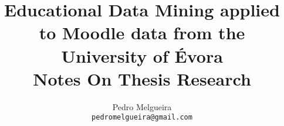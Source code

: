 \documentclass[12pt]{report}
\title{Educational Data Mining applied to Moodle data from the University of
Évora
\\
\large Notes On Thesis Research}
\author{Pedro Melgueira\\
    \small{\texttt{pedromelgueira@gmail.com}}
}
\date{}
\begin{document}
\maketitle

\tableofcontents
\listoffigures
\listoftables






\printglossary



\end{document}
